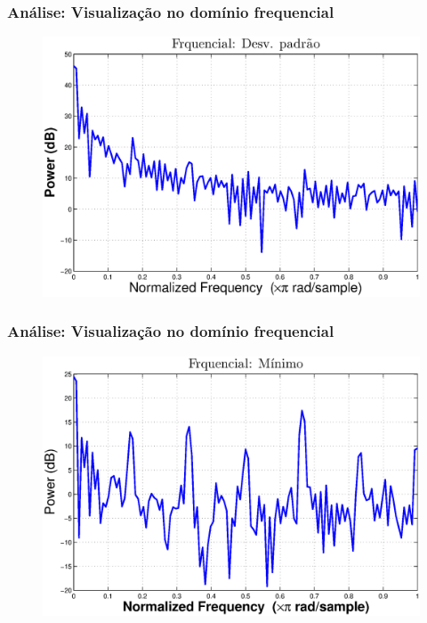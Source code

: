 \documentclass[xcolor=dvipsnames,xcolor=table]{beamer}
\begin{document}
\begin{frame}\frametitle{Análise: Visualização no domínio frequencial}
\begin{figure}[htpb] \begin{center} 
\includegraphics[width=0.9\columnwidth]{fq2}
\end{center}
\end{figure}
\end{frame}

\begin{frame}\frametitle{Análise: Visualização no domínio frequencial}
\begin{figure}[htpb] \begin{center} 
\includegraphics[width=0.9\columnwidth]{fq3}
\end{center}
\end{figure}
\end{frame}
\end{document}
